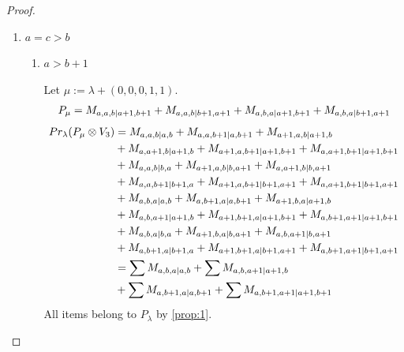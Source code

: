 \begin{proof}
\begin{enumerate}
  \item $a=c>b$ 
    \begin{enumerate}
      \item $a>b+1$\par
        Let $\mu:=\lambda + (0,0,0,1,1) $.
        \begin{equation}\notag
          \begin{aligned}
            P_\mu = M_{a,a,b|a+1,b+1}
+ M_{a,a,b|b+1,a+1}
+ M_{a,b,a|a+1,b+1}
+ M_{a,b,a|b+1,a+1}
          \end{aligned}
        \end{equation}
        \begin{equation}\notag
          \begin{aligned}
            Pr_{\lambda}(P_\mu \otimes V_{3}) &=
M_{a,a,b|a,b}
+ M_{a,a,b+1|a,b+1}
+ M_{a+1,a,b|a+1,b}\\
                                              &
+ M_{a,a+1,b|a+1,b}
+ M_{a+1,a,b+1|a+1,b+1}
+ M_{a,a+1,b+1|a+1,b+1}\\
                                              &
+ M_{a,a,b|b,a}
+ M_{a+1,a,b|b,a+1}
+ M_{a,a+1,b|b,a+1}\\
                                              &
+ M_{a,a,b+1|b+1,a}
+ M_{a+1,a,b+1|b+1,a+1}
+ M_{a,a+1,b+1|b+1,a+1}\\
                                              &
+ M_{a,b,a|a,b}
+ M_{a,b+1,a|a,b+1}
+ M_{a+1,b,a|a+1,b}\\
                                              &
+ M_{a,b,a+1|a+1,b}
+ M_{a+1,b+1,a|a+1,b+1}
+ M_{a,b+1,a+1|a+1,b+1}\\
                                              &
+ M_{a,b,a|b,a}
+ M_{a+1,b,a|b,a+1}
+ M_{a,b,a+1|b,a+1}\\
                                              &
+ M_{a,b+1,a|b+1,a}
+ M_{a+1,b+1,a|b+1,a+1}
+ M_{a,b+1,a+1|b+1,a+1} \\
                                               &=
\sum M_{a,b,a|a,b}
+ \sum M_{a,b,a+1|a+1,b}\\
                                              &
+ \sum M_{a,b+1,a|a,b+1}
+ \sum M_{a,b+1,a+1|a+1,b+1}
          \end{aligned}
        \end{equation}
All items belong to $P_\lambda$ by \cref{prop:1}.


\end{enumerate}
\end{enumerate}
\end{proof}
